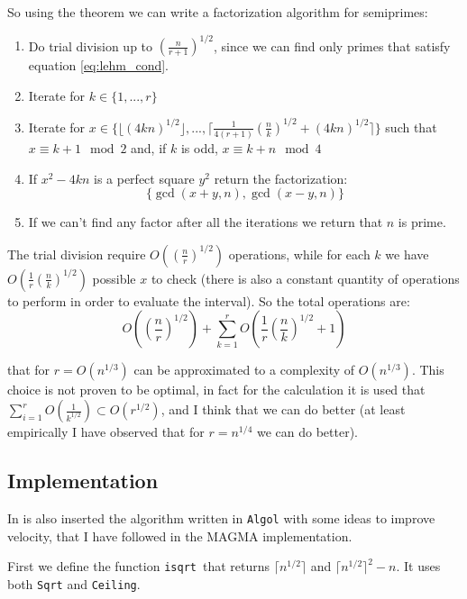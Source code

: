\documentclass{article}
\theoremstyle{plain}
\theoremstyle{remark}
\theoremstyle{definition}
\begin{document}
So using the theorem we can write a factorization algorithm for semiprimes:
\begin{enumerate}
	\item \label{enum:trial_div} Do trial division up to $\left( \frac{n}{r+1}\right)^{1/2}$, since we can find only primes that satisfy equation \ref{eq:lehm_cond}.
	\item Iterate for $k \in \{ 1,...,r\}$ 
	\item \label{enum:lehm_xit} Iterate for $x \in \{ \lfloor (4kn)^{1/2}\rfloor , ..., \lceil \frac{1}{4(r+1)} \left(\frac{n}{k}\right)^{1/2} + (4kn)^{1/2} \rceil \}$ such that $x \equiv k + 1 \mod 2$ and, if $k$ is odd, $x \equiv k + n \mod 4$
	\item If $x^2 - 4kn$ is a perfect square $y^2$ return the factorization: 
		$$\{\gcd(x+y,n), \gcd(x-y,n)\}$$
	\item If we can't find any factor after all the iterations we return that $n$ is prime.
\end{enumerate}

The trial division require $O\left( \left( \frac{n}{r}\right)^{1/2} \right)$ operations, while for each $k$ we have $O\left( \frac{1}{r} \left(\frac{n}{k}\right)^{1/2} \right)$ possible $x$ to check (there is also a constant quantity of operations to perform in order to evaluate the interval). So the total operations are:
\begin{equation}
	\label{eq:lehm_compl}
	O\left( \left( \frac{n}{r}\right)^{1/2} \right) + \sum_{k =1}^r O\left( \frac{1}{r} \left(\frac{n}{k}\right)^{1/2} + 1\right)
\end{equation}

that for $r = O(n^{1/3})$ can be approximated to a complexity of $O(n^{1/3})$. This choice is not proven to be optimal, in fact for the calculation it is used that $ \sum_{i=1}^r O\left( \frac{1}{k^{1/2}}\right) \subset O(r^{1/2})$, and I think that we can do better (at least empirically I have observed that for $r = n^{1/4}$ we can do better).

\subsection{Implementation}

In \cite[Section 5]{lehman} is also inserted the algorithm written in \texttt{Algol} with some ideas to improve velocity, that I have followed in the MAGMA implementation. 

First we define the function \texttt{isqrt} that returns $\lceil n^{1/2}\rceil$ and $\lceil n^{1/2}\rceil^2 - n$. It uses both \texttt{Sqrt} and \texttt{Ceiling}. 
\end{document}
